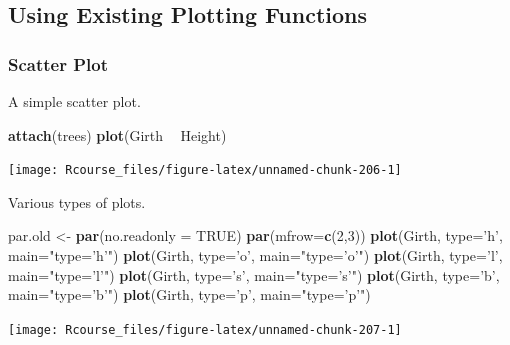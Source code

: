 \documentclass[]{book}
\newenvironment{Shaded}{\begin{snugshade}}{\end{snugshade}}
\newcommand{\KeywordTok}[1]{\textcolor[rgb]{0.13,0.29,0.53}{\textbf{#1}}}
\newcommand{\DataTypeTok}[1]{\textcolor[rgb]{0.13,0.29,0.53}{#1}}
\newcommand{\DecValTok}[1]{\textcolor[rgb]{0.00,0.00,0.81}{#1}}
\newcommand{\StringTok}[1]{\textcolor[rgb]{0.31,0.60,0.02}{#1}}
\newcommand{\OtherTok}[1]{\textcolor[rgb]{0.56,0.35,0.01}{#1}}
\newcommand{\OperatorTok}[1]{\textcolor[rgb]{0.81,0.36,0.00}{\textbf{#1}}}
\newcommand{\NormalTok}[1]{#1}
\theoremstyle{definition}
\theoremstyle{definition}
\theoremstyle{definition}
\theoremstyle{remark}
\begin{document}
\subsection{Using Existing Plotting
Functions}\label{using-existing-plotting-functions}

\subsubsection{Scatter Plot}\label{scatter-plot}

A simple scatter plot.

\begin{Shaded}
\begin{Highlighting}[]
\KeywordTok{attach}\NormalTok{(trees)}
\KeywordTok{plot}\NormalTok{(Girth }\OperatorTok{~}\StringTok{ }\NormalTok{Height)}
\end{Highlighting}
\end{Shaded}

\texttt{[image: Rcourse\_files/figure-latex/unnamed-chunk-206-1]}

Various types of plots.

\begin{Shaded}
\begin{Highlighting}[]
\NormalTok{par.old <-}\StringTok{ }\KeywordTok{par}\NormalTok{(}\DataTypeTok{no.readonly =} \OtherTok{TRUE}\NormalTok{)}
\KeywordTok{par}\NormalTok{(}\DataTypeTok{mfrow=}\KeywordTok{c}\NormalTok{(}\DecValTok{2}\NormalTok{,}\DecValTok{3}\NormalTok{))}
\KeywordTok{plot}\NormalTok{(Girth, }\DataTypeTok{type=}\StringTok{'h'}\NormalTok{, }\DataTypeTok{main=}\StringTok{"type='h'"}\NormalTok{) }
\KeywordTok{plot}\NormalTok{(Girth, }\DataTypeTok{type=}\StringTok{'o'}\NormalTok{, }\DataTypeTok{main=}\StringTok{"type='o'"}\NormalTok{) }
\KeywordTok{plot}\NormalTok{(Girth, }\DataTypeTok{type=}\StringTok{'l'}\NormalTok{, }\DataTypeTok{main=}\StringTok{"type='l'"}\NormalTok{)}
\KeywordTok{plot}\NormalTok{(Girth, }\DataTypeTok{type=}\StringTok{'s'}\NormalTok{, }\DataTypeTok{main=}\StringTok{"type='s'"}\NormalTok{)}
\KeywordTok{plot}\NormalTok{(Girth, }\DataTypeTok{type=}\StringTok{'b'}\NormalTok{, }\DataTypeTok{main=}\StringTok{"type='b'"}\NormalTok{)}
\KeywordTok{plot}\NormalTok{(Girth, }\DataTypeTok{type=}\StringTok{'p'}\NormalTok{, }\DataTypeTok{main=}\StringTok{"type='p'"}\NormalTok{)}
\end{Highlighting}
\end{Shaded}

\texttt{[image: Rcourse\_files/figure-latex/unnamed-chunk-207-1]}
\end{document}
